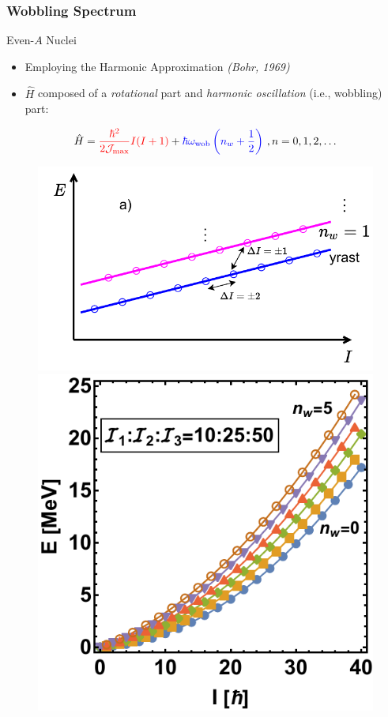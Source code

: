 \documentclass{beamer}
\begin{document}
\begin{frame}
  \frametitle{Wobbling Spectrum}
\begin{block}{Even-$A$ Nuclei}
  \begin{itemize}
    \item Employing the Harmonic Approximation \textit{(Bohr, 1969)}
    \item $\hat{H}$ composed of a {\color{red}\emph{rotational}} part and {\color{blue}\emph{harmonic oscillation}} (i.e., wobbling) part:
  \end{itemize}
  \begin{align}
    \hat{H}={\color{red}\frac{\hbar^2}{2\mathcal{J}_\text{max}}I(I+1)}+{\color{blue}\hbar\omega_\text{wob}\left(n_w+\frac{1}{2}\right)}\ , n=0,1,2,\dots
    \label{wobbling-hamiltonian-even-A}
  \end{align}
\end{block}
\begin{figure}
  \includegraphics[scale=0.4]{Figs/wobbling_n_schematic-1.pdf}
  \includegraphics[scale=0.35]{Figs/wobblingFreq-evenA.pdf}
\end{figure}
\end{frame}
\end{document}
